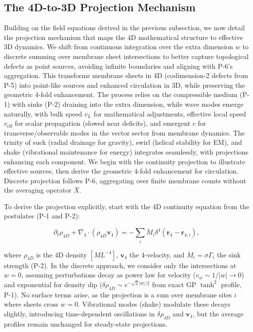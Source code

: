 \subsection{The 4D-to-3D Projection Mechanism}
\label{sec:projection}

Building on the field equations derived in the previous subsection, we now detail the projection mechanism that maps the 4D mathematical structure to effective 3D dynamics. We shift from continuous integration over the extra dimension $w$ to discrete summing over membrane sheet intersections to better capture topological defects as point sources, avoiding infinite boundaries and aligning with P-6's aggregation. This transforms membrane sheets in 4D (codimension-2 defects from P-5) into point-like sources and enhanced circulation in 3D, while preserving the geometric 4-fold enhancement. The process relies on the compressible medium (P-1) with sinks (P-2) draining into the extra dimension, while wave modes emerge naturally, with bulk speed $v_L$ for mathematical adjustments, effective local speed $v_{\text{eff}}$ for scalar propagation (slowed near deficits), and emergent $c$ for transverse/observable modes in the vector sector from membrane dynamics. The trinity of suck (radial drainage for gravity), swirl (helical stability for EM), and shake (vibrational maintenance for energy) integrates seamlessly, with projections enhancing each component. We begin with the continuity projection to illustrate effective sources, then derive the geometric 4-fold enhancement for circulation. Discrete projection follows P-6, aggregating over finite membrane counts without the averaging operator $\overline{X}$.

To derive the projection explicitly, start with the 4D continuity equation from the postulates (P-1 and P-2):

\begin{equation}
\partial_t \rho_{4D} + \nabla_4 \cdot (\rho_{4D} \mathbf{v}_4) = -\sum_i \dot{M}_i \delta^4(\mathbf{r}_4 - \mathbf{r}_{4,i}),
\end{equation}

where $\rho_{4D}$ is the 4D density $[M L^{-4}]$, $\mathbf{v}_4$ the 4-velocity, and $\dot{M}_i = \sigma \Gamma_i$ the sink strength (P-2). In the discrete approach, we consider only the intersections at $w=0$, assuming perturbations decay as power law for velocity ($v_w \sim 1/|w| \to 0$) and exponential for density dip ($\delta \rho_{4D} \sim e^{-\sqrt{2} |w|/\xi}$ from exact GP $\tanh^2$ profile, P-1). No surface terms arise, as the projection is a sum over membrane sites $i$ where sheets cross $w=0$. Vibrational modes (shake) modulate these decays slightly, introducing time-dependent oscillations in $\delta \rho_{4D}$ and $\mathbf{v}_4$, but the average profiles remain unchanged for steady-state projections.

